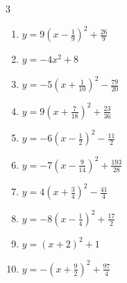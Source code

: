 \begin{multicols}{3}
\begin{enumerate}

  \item $\displaystyle y=9\left( x-\frac{1}{9}\right)^{2}+\frac{26}{9}$


  \item $\displaystyle y=-4x^{2}+8$

        \phantom{$\displaystyle 頂点\left( 0 , 8 \right)$}

  \item $\displaystyle y=-5\left( x+\frac{1}{10}\right)^{2}-\frac{79}{20}$


\columnbreak %

  \item $\displaystyle y=9\left( x+\frac{7}{18}\right)^{2}+\frac{23}{36}$


  \item $\displaystyle y=-6\left( x-\frac{1}{2}\right)^{2}-\frac{11}{2}$


  \item $\displaystyle y=-7\left( x-\frac{9}{14}\right)^{2}+\frac{193}{28}$


  \item $\displaystyle y=4\left( x+\frac{3}{4}\right)^{2}-\frac{41}{4}$


  \item $\displaystyle y=-8\left( x-\frac{1}{4}\right)^{2}+\frac{17}{2}$


  \item $\displaystyle y=\left( x+2\right)^{2}+1$

        \phantom{$\displaystyle 頂点\left( -2 , 1 \right)$}

  \item $\displaystyle y=-\left( x+\frac{9}{2}\right)^{2}+\frac{97}{4}$


\end{enumerate}
\end{multicols}
